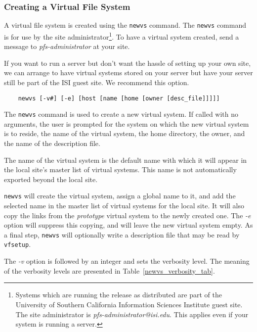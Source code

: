 \subsubsection{Creating a Virtual File System\label{creating_vfs}}

A virtual file system is created using the {\tt newvs} command.  The
{\tt newvs} command is for use by the site
administrator\footnote{Systems which are running the release as
distributed are part of the University of Southern California
Information Sciences Institute guest site.  The site 
administrator is {\it pfs-administrator@isi.edu}.  This
applies even if your system is running a server.}.  To have a virtual
system created, send a message to {\it pfs-administrator} at your
site.

If you want to run a server but don't want the hassle of setting up
your own site, we can arrange to have virtual systems stored on your
server but have your server still be part of the ISI guest site.  We
recommend this option.

\begin{verbatim}
    newvs [-v#] [-e] [host [name [home [owner [desc_file]]]]]
\end{verbatim}

The {\tt newvs} command is used to create a new virtual system.  If
called with no arguments, the user is prompted for the system on which
the new virtual system is to reside, the name of the virtual system,
the home directory, the owner, and the name of the description file.

The name of the virtual system is the default name with which it will
appear in the local site's master list of virtual systems.  This name
is not automatically exported beyond the local site.

{\tt newvs} will create the virtual system, assign a global name to
it, and add the selected name in the master list of virtual systems
for the local site.  It will also copy the links from the {\it
prototype} virtual system to the newly created one.  The {\em -e}
option will suppress this copying, and will leave the new virtual
system empty.  As a final step, {\tt newvs} will optionally write a
description file that may be read by {\tt vfsetup}.

The {\em -v} option is followed by an integer and sets the verbosity
level.  The meaning of the verbosity levels are presented in
Table~\ref{newvs_verbosity_tab}.

